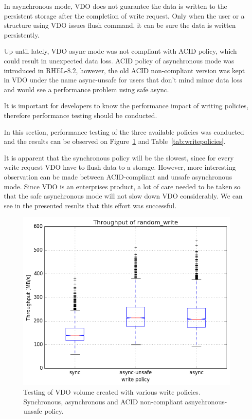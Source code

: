 \documentclass[
  color, %
  table, %
  lof,   %
  lot,   %
]{fithesis3}
\begin{document}
In asynchronous mode, VDO does not guarantee the data is written to the persistent storage after the completion of write request. Only when the user or a structure using VDO issues flush command, it can be sure the data is written persistently.

Up until lately, VDO async mode was not compliant with ACID policy, which could result in unexpected data loss. ACID policy of asynchronous mode was introduced in RHEL-8.2, however, the old ACID non-compliant version was kept in VDO under the name async-unsafe for users that don't mind minor data loss and would see a performance problem using safe async.

It is important for developers to know the performance impact of writing policies, therefore performance testing should be conducted.

In this section, performance testing of the three available policies was conducted and the results can be observed on Figure~\ref{fig:writepolicies} and Table~\ref{tab:writepolicies}.

It is apparent that the synchronous policy will be the slowest, since for every write request VDO have to flush data to a storage. However, more interesting observation can be made between ACID-compliant and unsafe asynchronous mode. Since VDO is an enterprises product, a lot of care needed to be taken so that the safe asynchronous mode will not slow down VDO considerably. We can see in the presented results that this effort was successful.

\begin{figure}[!htb]
        \centering
        \includegraphics[width=\textwidth]{../results/write_policies/report/random_write1_compare_boxplots}
\caption[Performance of various write policies]{Testing of VDO volume created with various write policies. Synchronous, asynchronous and ACID non-compliant asnychronous-unsafe policy.}
\label{fig:writepolicies}
\end{figure}
\end{document}
